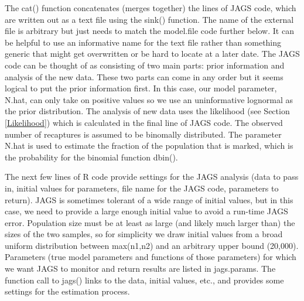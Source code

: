 \documentclass[
]{krantz}
\begin{document}
The cat() function concatenates (merges together) the lines of JAGS code, which are written out as a text file using the sink() function. The name of the external file is arbitrary but just needs to match the model.file code further below. It can be helpful to use an informative name for the text file rather than something generic that might get overwritten or be hard to locate at a later date. The JAGS code can be thought of as consisting of two main parts: prior information and analysis of the new data. These two parts can come in any order but it seems logical to put the prior information first. In this case, our model parameter, N.hat, can only take on positive values so we use an uninformative lognormal \citep{mccarthy2007} as the prior distribution. The analysis of new data uses the likelihood (see Section \ref{Likelihood}) which is calculated in the final line of JAGS code. The observed number of recaptures is assumed to be binomally distributed. The parameter N.hat is used to estimate the fraction of the population that is marked, which is the probability for the binomial function dbin().

The next few lines of R code provide settings for the JAGS analysis (data to pass in, initial values for parameters, file name for the JAGS code, parameters to return). JAGS is sometimes tolerant of a wide range of initial values, but in this case, we need to provide a large enough initial value to avoid a run-time JAGS error. Population size must be at least as large (and likely much larger than) the sizes of the two samples, so for simplicity we draw initial values from a broad uniform distribution between max(n1,n2) and an arbitrary upper bound (20,000). Parameters (true model parameters and functions of those parameters) for which we want JAGS to monitor and return results are listed in jags.params. The function call to jags() links to the data, initial values, etc., and provides some settings for the estimation process.
\end{document}
